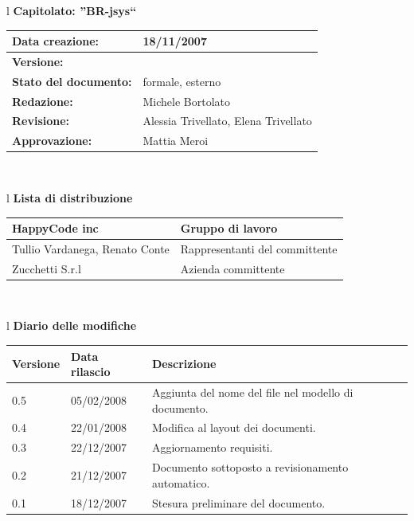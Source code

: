 \documentclass[11pt,titlepage,a4paper]{report}
\begin{document}
\begin{center}
\thispagestyle{plain}
\begin{table}[htbp]
\large{
\begin{tabular}{l}
\Large{\textbf{\textsf{Capitolato: ''BR-jsys``}}} \\
\begin{tabular}{||p{6cm}||p{6cm}||} \hline
\textbf{Data creazione:} & 18/11/2007 \\ \hline
\textbf{Versione:} & \lv \\ \hline
\textbf{Stato del documento:} & formale, esterno \\ \hline
\textbf{Redazione:} & Michele Bortolato \\ \hline
\textbf{Revisione:} & Alessia Trivellato, Elena Trivellato  \\ \hline
\textbf{Approvazione:}  & Mattia Meroi \\ \hline
\end{tabular} \\
\end{tabular}
}
\end{table}
\begin{table}[hbtp]
\large{
\begin{tabular}{l}
\Large{\textbf{\textsf{Lista di distribuzione}}} \\
\begin{tabular}{||p{6cm}||p{6cm}||} \hline
{HappyCode inc}& Gruppo di lavoro\\ \hline
{Tullio Vardanega, Renato Conte}& Rappresentanti del committente \\ \hline 
{Zucchetti S.r.l}& Azienda committente\\ \hline
\end{tabular} \\
\end{tabular}
}
\end{table}

\begin{table}[hbtp]
\large{
\begin{tabular}{l}
\Large{\textbf{\textsf{Diario delle modifiche}}} \\
\begin{tabular}{||p{2cm}||p{3.5cm}||p{6cm}||} \hline
\textbf{Versione} & \textbf{Data rilascio} & \textbf{Descrizione} \\ \hline
0.5 & 05/02/2008 & Aggiunta del nome del file nel modello di documento.\\ \hline
0.4 & 22/01/2008 & Modifica al layout dei documenti.\\ \hline
0.3 & 22/12/2007 & Aggiornamento requisiti. \\ \hline \hline
0.2 & 21/12/2007 & Documento sottoposto a revisionamento automatico.\\ \hline
0.1 & 18/12/2007 & Stesura preliminare del documento. \\ \hline


\end{tabular}
\end{tabular}}
\end{table}
\end{center}
\end{document}
